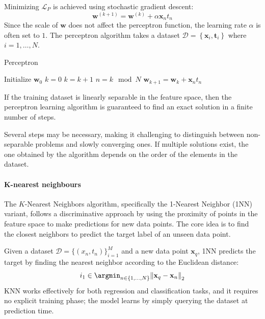 Minimizing $\mathcal{L}_P$ is achieved using stochastic gradient descent:
\[\textbf{w}^{(k+1)}=\textbf{w}^{(k)}+\alpha\textbf{x}_nt_n\]
Since the scale of $\textbf{w}$ does not affect the perceptron function, the learning rate $\alpha$ is often set to $1$. 
The perceptron algorithm takes a dataset $\mathcal{D}=\left\{ \textbf{x}_i,\textbf{t}_i  \right\}$ where $i=1,\dots,N$. 
\begin{algorithm}[H]
    \caption{Perceptron}
        \begin{algorithmic}[1]
            \State Initialize $\textbf{w}_0$
            \State $k = 0$
            \Repeat
                \State $k = k+1$
                \State $n = k \mod N$
                    \State $\textbf{w}_{k+1} = \textbf{w}_k + \textbf{x}_nt_n$
                \EndIf
        \end{algorithmic}
\end{algorithm}
\begin{theorem}
    If the training dataset is linearly separable in the feature space, then the perceptron learning algorithm is guaranteed to find an exact solution in a finite number of steps.
\end{theorem}
Several steps may be necessary, making it challenging to distinguish between non-separable problems and slowly converging ones. 
If multiple solutions exist, the one obtained by the algorithm depends on the order of the elements in the dataset.

\paragraph*{K-nearest neighbours}
The $K$-Nearest Neighbors algorithm, specifically the 1-Nearest Neighbor (1NN) variant, follows a discriminative approach by using the proximity of points in the feature space to make predictions for new data points. 
The core idea is to find the closest neighbors to predict the target label of an unseen data point.

Given a dataset $\mathcal{D}=\{(x_n,t_n)\}_{i=1}^M$ and a new data point $\mathbf{x}_q$, 1NN predicts the target by finding the nearest neighbor according to the Euclidean distance:
\[i_1\in\argmin_{n\in\{1,\dots,N\}}{\left\lVert \mathbf{x}_q- \mathbf{x}_n\right\rVert}_2 \]
KNN works effectively for both regression and classification tasks, and it requires no explicit training phase; the model learns by simply querying the dataset at prediction time.

